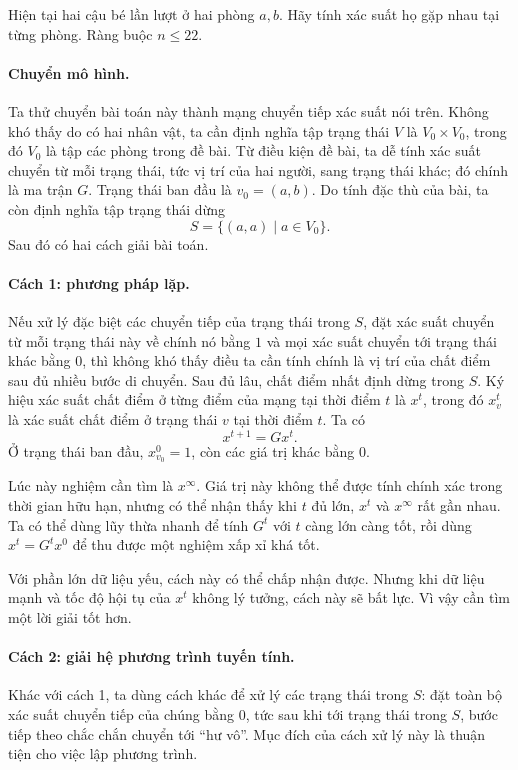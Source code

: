 \documentclass[11pt]{article}
\begin{document}
Hiện tại hai cậu bé lần lượt ở hai phòng \(a,b\). Hãy tính xác suất họ gặp
nhau tại từng phòng. Ràng buộc \(n\le 22\).

\paragraph{Chuyển mô hình.}
Ta thử chuyển bài toán này thành mạng chuyển tiếp xác suất nói trên. Không
khó thấy do có hai nhân vật, ta cần định nghĩa tập trạng thái \(V\) là
\(V_0\times V_0\), trong đó \(V_0\) là tập các phòng trong đề bài. Từ điều
kiện đề bài, ta dễ tính xác suất chuyển từ mỗi trạng thái, tức vị trí của hai
người, sang trạng thái khác; đó chính là ma trận \(G\). Trạng thái ban đầu là
\(v_0=(a,b)\). Do tính đặc thù của bài, ta còn định nghĩa tập trạng thái dừng
\[
  S=\{(a,a)\mid a\in V_0\}.
\]
Sau đó có hai cách giải bài toán.

\paragraph{Cách 1: phương pháp lặp.}
Nếu xử lý đặc biệt các chuyển tiếp của trạng thái trong \(S\), đặt xác suất
chuyển từ mỗi trạng thái này về chính nó bằng \(1\) và mọi xác suất chuyển
tới trạng thái khác bằng \(0\), thì không khó thấy điều ta cần tính chính là
vị trí của chất điểm sau đủ nhiều bước di chuyển. Sau đủ lâu, chất điểm nhất
định dừng trong \(S\). Ký hiệu xác suất chất điểm ở từng điểm của mạng tại
thời điểm \(t\) là \(x^t\), trong đó \(x_v^t\) là xác suất chất điểm ở trạng
thái \(v\) tại thời điểm \(t\). Ta có
\[
  x^{t+1}=Gx^t.
\]
Ở trạng thái ban đầu, \(x_{v_0}^0=1\), còn các giá trị khác bằng \(0\).

Lúc này nghiệm cần tìm là \(x^\infty\). Giá trị này không thể được tính chính
xác trong thời gian hữu hạn, nhưng có thể nhận thấy khi \(t\) đủ lớn,
\(x^t\) và \(x^\infty\) rất gần nhau. Ta có thể dùng lũy thừa nhanh để tính
\(G^t\) với \(t\) càng lớn càng tốt, rồi dùng \(x^t=G^tx^0\) để thu được một
nghiệm xấp xỉ khá tốt.

Với phần lớn dữ liệu yếu, cách này có thể chấp nhận được. Nhưng khi dữ liệu
mạnh và tốc độ hội tụ của \(x^t\) không lý tưởng, cách này sẽ bất lực. Vì
vậy cần tìm một lời giải tốt hơn.

\paragraph{Cách 2: giải hệ phương trình tuyến tính.}
Khác với cách 1, ta dùng cách khác để xử lý các trạng thái trong \(S\): đặt
toàn bộ xác suất chuyển tiếp của chúng bằng \(0\), tức sau khi tới trạng thái
trong \(S\), bước tiếp theo chắc chắn chuyển tới ``hư vô''. Mục đích của
cách xử lý này là thuận tiện cho việc lập phương trình.
\end{document}
